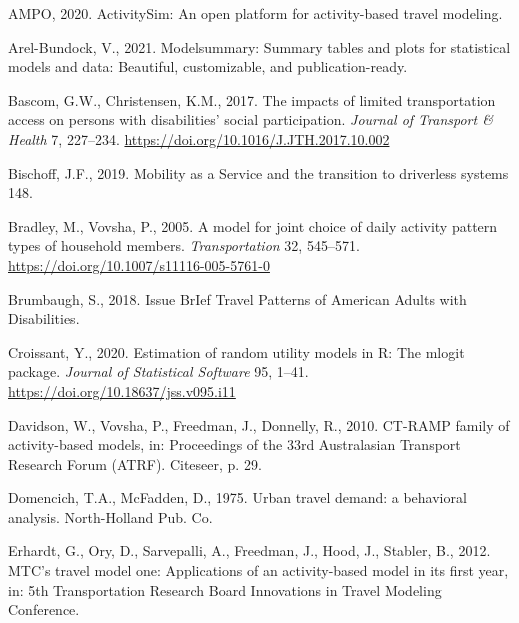 \documentclass[3p, authoryear, review]{elsarticle} %
\newlength{\cslhangindent}
\newenvironment{CSLReferences}[2] %
 {%
  \setlength{\parindent}{0pt}
  \ifodd #1 \everypar{\setlength{\hangindent}{\cslhangindent}}\ignorespaces\fi
  \ifnum #2 > 0
  \setlength{\parskip}{#2\baselineskip}
  \fi
 }%
 {}
\begin{document}
\hypertarget{refs}{}
\begin{CSLReferences}{1}{0}
\leavevmode{}%
AMPO, 2020. ActivitySim: An open platform for activity-based travel modeling.

\leavevmode{}%
Arel-Bundock, V., 2021. Modelsummary: Summary tables and plots for statistical models and data: Beautiful, customizable, and publication-ready.

\leavevmode{}%
Bascom, G.W., Christensen, K.M., 2017. {The impacts of limited transportation access on persons with disabilities' social participation}. \emph{Journal of Transport {\&} Health} 7, 227--234. \url{https://doi.org/10.1016/J.JTH.2017.10.002}

\leavevmode{}%
Bischoff, J.F., 2019. {Mobility as a Service and the transition to driverless systems} 148.

\leavevmode{}%
Bradley, M., Vovsha, P., 2005. {A model for joint choice of daily activity pattern types of household members}. \emph{Transportation} 32, 545--571. \url{https://doi.org/10.1007/s11116-005-5761-0}

\leavevmode{}%
Brumbaugh, S., 2018. {Issue BrIef Travel Patterns of American Adults with Disabilities}.

\leavevmode{}%
Croissant, Y., 2020. Estimation of random utility models in {R}: The {mlogit} package. \emph{Journal of Statistical Software} 95, 1--41. \url{https://doi.org/10.18637/jss.v095.i11}

\leavevmode{}%
Davidson, W., Vovsha, P., Freedman, J., Donnelly, R., 2010. CT-RAMP family of activity-based models, in: Proceedings of the 33rd Australasian Transport Research Forum (ATRF). Citeseer, p. 29.

\leavevmode{}%
Domencich, T.A., McFadden, D., 1975. {Urban travel demand: a behavioral analysis}. North-Holland Pub. Co.

\leavevmode{}%
Erhardt, G., Ory, D., Sarvepalli, A., Freedman, J., Hood, J., Stabler, B., 2012. MTC's travel model one: Applications of an activity-based model in its first year, in: 5th Transportation Research Board Innovations in Travel Modeling Conference.


\end{CSLReferences}
\end{document}
